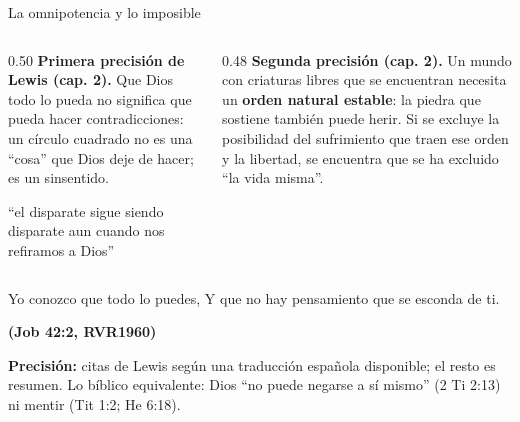 \documentclass[hyperref={bookmarks=false},aspectratio=169]{beamer}
\newcommand{\fuente}[1]{\par\hfill{\upshape\bfseries\footnotesize\textcolor{azul}{#1}}}
\newcommand{\destacar}[1]{\textbf{\textcolor{azul}{#1}}}
\newcommand{\precision}[1]{{\footnotesize\color{gris}\textbf{Precisión:} #1}}
\begin{document}
\begin{frame}{La omnipotencia y lo imposible}
\begin{columns}[t,onlytextwidth]
\begin{column}{0.50\textwidth}\small
\textbf{Primera precisión de Lewis (cap. 2).} Que Dios todo lo pueda no significa que pueda hacer contradicciones: un círculo cuadrado no es una ``cosa'' que Dios deje de hacer; es un sinsentido.
\begin{tcolorbox}[colback=papiro,colframe=dorado,boxrule=1.2pt,arc=3pt]
\footnotesize ``el disparate sigue siendo disparate aun cuando nos refiramos a Dios''
\end{tcolorbox}
\end{column}
\begin{column}{0.48\textwidth}\small
\textbf{Segunda precisión (cap. 2).} Un mundo con criaturas libres que se encuentran necesita un \destacar{orden natural estable}: la piedra que sostiene también puede herir. Si se excluye la posibilidad del sufrimiento que traen ese orden y la libertad, se encuentra que se ha excluido ``la vida misma''.
\end{column}
\end{columns}\par\medskip
\begin{cita}Yo conozco que todo lo puedes, Y que no hay pensamiento que se esconda de ti.\fuente{(Job 42:2, RVR1960)}\end{cita}
\precision{citas de Lewis según una traducción española disponible; el resto es resumen. Lo bíblico equivalente: Dios ``no puede negarse a sí mismo'' (2 Ti 2:13) ni mentir (Tit 1:2; He 6:18).}
\end{frame}
\end{document}
